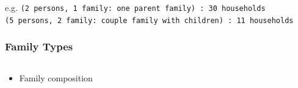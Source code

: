 \begin{frame}
{\begin{columns}[T]
\begin{column}{.6\textwidth}
\begin{itemize}
          \end{itemize}
          
        \end{column}%
      \end{columns}
      
      e.g. \texttt{(2 persons, 1 family: one parent family) : 30 households}\\
      \hspace{2em}\texttt{(5 persons, 2 family: couple family with children) :
        11 households}\\ }%
\end{frame}
  
\begin{frame}%
  \frametitle{Family Types} %
  \begin{columns}[T]%
    \begin{column}{0.98\textwidth}%
  \begin{itemize}%
    \setlength\itemsep{1em} %
    \item Family composition%
    

\end{itemize}
\end{column}
\end{columns}
\end{frame}
